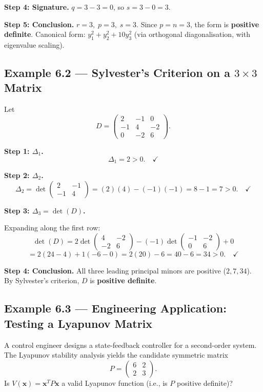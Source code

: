 \documentclass[12pt,a4paper]{article}
\begin{document}
\textbf{Step 4: Signature.}
\(q = 3 - 3 = 0\), so \(s = 3 - 0 = 3\).

\textbf{Step 5: Conclusion.}
\(r = 3,\; p = 3,\; s = 3\). Since \(p = n = 3\), the form is
\textbf{positive definite}. Canonical form: \(y_1^2 + y_2^2 + 10y_3^2\) (via orthogonal
diagonalisation, with eigenvalue scaling).

\subsection*{Example 6.2 --- Sylvester's Criterion on a \(3 \times 3\) Matrix}

Let
\[
D = \begin{pmatrix} 2 & -1 & 0 \\ -1 & 4 & -2 \\ 0 & -2 & 6 \end{pmatrix}.
\]

\textbf{Step 1: \(\Delta_1\).}
\[\Delta_1 = 2 > 0. \quad \checkmark\]

\textbf{Step 2: \(\Delta_2\).}
\[
\Delta_2 = \det\begin{pmatrix}2 & -1 \\ -1 & 4\end{pmatrix}
= (2)(4) - (-1)(-1) = 8 - 1 = 7 > 0. \quad \checkmark
\]

\textbf{Step 3: \(\Delta_3 = \det(D)\).}

Expanding along the first row:
\[
\det(D) = 2\det\begin{pmatrix}4 & -2 \\ -2 & 6\end{pmatrix}
- (-1)\det\begin{pmatrix}-1 & -2 \\ 0 & 6\end{pmatrix}
+ 0
\]
\[
= 2(24 - 4) + 1(-6 - 0) = 2(20) - 6 = 40 - 6 = 34 > 0. \quad \checkmark
\]

\textbf{Step 4: Conclusion.}
All three leading principal minors are positive (\(2, 7, 34\)).
By Sylvester's criterion, \(D\) is \textbf{positive definite}.

\subsection*{Example 6.3 --- Engineering Application: Testing a Lyapunov Matrix}

A control engineer designs a state-feedback controller for a second-order system.
The Lyapunov stability analysis yields the candidate symmetric matrix
\[
P = \begin{pmatrix} 6 & 2 \\ 2 & 3 \end{pmatrix}.
\]
Is \(V(\mathbf{x}) = \mathbf{x}^{T} P \mathbf{x}\) a valid Lyapunov function (i.e., is
\(P\) positive definite)?
\end{document}
